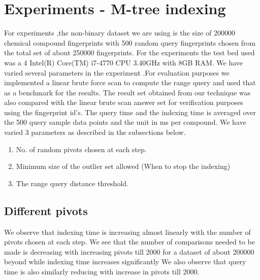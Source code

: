
\section{Experiments - M-tree indexing}

For experiments ,the non-binary dataset we are using is the size of 200000 chemical compound fingerprints with 500 random query fingerprints chosen from the total set of about 250000 fingerprints. For the experiments the test bed used was a 4 Intel(R) Core(TM) i7-4770 CPU \@ 3.40GHz with 8GB RAM. We have varied several parameters in the experiment .For evaluation purposes we implemented a linear brute force scan to compute the range query and used that as a benchmark for the results. The result set obtained from our technique was also compared with the linear brute scan answer set for verification purposes using the fingerprint id's. The query time and the indexing time is averaged over the 500 query sample data points and the unit in ms per compound. We have varied 3 parameters as described in the subsections below.

\begin{enumerate}

	\item No. of random pivots chosen at each step.

	\item Minimum size of the outlier set allowed (When to stop the indexing)

	\item The range query distance threshold.	\\
\end{enumerate}

\subsection{Different pivots}

We observe that indexing time is increasing almost linearly with the number of pivots chosen at each step. We see that the number of comparisons needed to be made is decreasing with increasing pivots till 2000 for a dataset of about 200000 beyond while indexing time increases significantly We also observe that query time is also similarly reducing with increase in pivots till 2000.

